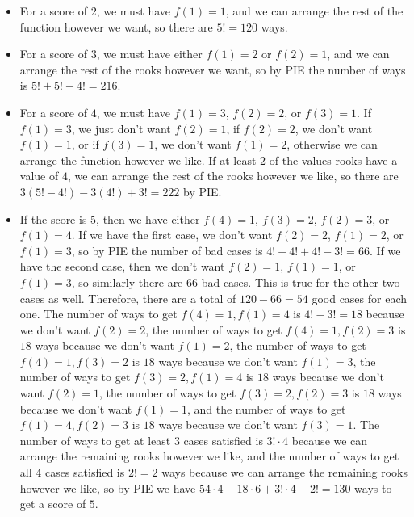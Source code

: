 \begin{enumerate}
 
            \begin{itemize}
        \item For a score of $2$, we must have $f(1)=1$, and we can arrange the rest of the function however we want, so there are $5!=120$ ways.
            \end{itemize}
            
            \begin{itemize}
        \item For a score of $3$, we must have either $f(1)=2$ or $f(2)=1$, and we can arrange the rest of the rooks however we want, so by PIE the number of ways is $5!+5!-4!=216$.
            \end{itemize}
            
            \begin{itemize}
        \item For a score of $4$, we must have $f(1)=3$, $f(2)=2$, or $f(3)=1$. If $f(1)=3$, we just don't want $f(2)=1$, if $f(2)=2$, we don't want $f(1)=1$, or if $f(3)=1$, we don't want $f(1)=2$, otherwise we can arrange the function however we like. If at least $2$ of the values rooks have a value of $4$, we can arrange the rest of the rooks however we like, so there are $3(5!-4!)-3(4!)+3!=222$ by PIE.
            \end{itemize}
            
            \begin{itemize}
        \item If the score is $5$, then we have either $f(4)=1$, $f(3)=2$, $f(2)=3$, or $f(1)=4$. If we have the first case, we don't want $f(2)=2$, $f(1)=2$, or $f(1)=3$, so by PIE the number of bad cases is $4!+4!+4!-3!=66$. If we have the second case, then we don't want $f(2)=1$, $f(1)=1$, or $f(1)=3$, so similarly there are $66$ bad cases. This is true for the other two cases as well. Therefore, there are a total of $120-66=54$ good cases for each one. The number of ways to get $f(4)=1, f(1)=4$ is $4!-3!=18$ because we don't want $f(2)=2$, the number of ways to get $f(4)=1, f(2)=3$ is $18$ ways because we don't want $f(1)=2$, the number of ways to get $f(4)=1, f(3)=2$ is $18$ ways because we don't want $f(1)=3$, the number of ways to get $f(3)=2, f(1)=4$ is $18$ ways because we don't want $f(2)=1$, the number of ways to get $f(3)=2, f(2)=3$ is $18$ ways because we don't want $f(1)=1$, and the number of ways to get $f(1)=4, f(2)=3$ is $18$ ways because we don't want $f(3)=1$. The number of ways to get at least $3$ cases satisfied is $3! \cdot 4$ because we can arrange the remaining rooks however we like, and the number of ways to get all $4$ cases satisfied is $2!=2$  ways because we can arrange the remaining rooks however we like, so by PIE we have $54 \cdot 4-18 \cdot 6 + 3! \cdot 4-2!=130$ ways to get a score of $5$.
            \end{itemize}
            

\end{enumerate}
